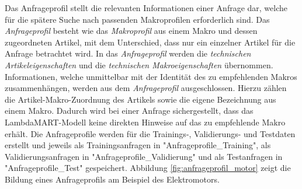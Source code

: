 Das Anfrageprofil stellt die relevanten Informationen einer Anfrage dar, welche für die spätere Suche nach passenden Makroprofilen erforderlich sind.
Das \textit{Anfrageprofil} besteht wie das \textit{Makroprofil} aus einem Makro und dessen zugeordneten Artikel, mit dem Unterschied, dass nur ein einzelner Artikel für die Anfrage betrachtet wird. 
In das \textit{Anfrageprofil} werden die \textit{technischen Artikeleigenschaften} und die \textit{technischen Makroeigenschaften} übernommen. 
Informationen, welche unmittelbar mit der Identität des zu empfehlenden Makros zusammenhängen, werden aus dem \textit{Anfrageprofil} ausgeschlossen. Hierzu zählen die Artikel-Makro-Zuordnung des Artikels sowie 
die eigene Bezeichnung aus einem Makro. Dadurch wird bei einer Anfrage sichergestellt, dass das LambdaMART-Modell keine direkten Hinweise auf das zu empfehlende Makro erhält. 
Die Anfrageprofile werden für die Trainings-, Validierungs- und Testdaten erstellt und jeweils als Trainingsanfragen in "Anfrageprofile\_Training", als Validierungsanfragen in "Anfrageprofile\_Validierung" und als Testanfragen in "Anfrageprofile\_Test" gespeichert. 
Abbildung \ref{fig:anfrageprofil_motor} zeigt die Bildung eines Anfrageprofils am Beispiel des Elektromotors.

